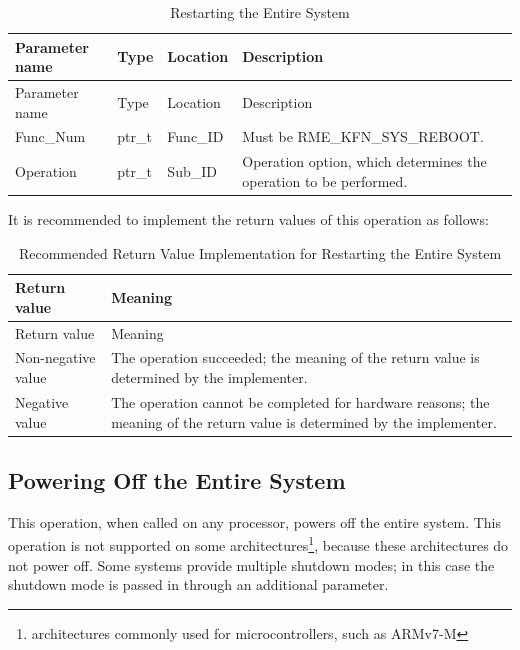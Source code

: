 \begin{xltabular}{\textwidth}{@{}>{\hsize\raggedright\arraybackslash}X>{\hsize\raggedright\arraybackslash}X>{\hsize\raggedright\arraybackslash}X>{\hsize\raggedright\arraybackslash}X@{}}
\caption{Restarting the Entire System}\label{tab:8-45-reboot-system}\\
\toprule
Parameter name & Type & Location & Description\tabularnewline
\endfirsthead
\toprule
Parameter name & Type & Location & Description\tabularnewline
\midrule
\endhead
\bottomrule
\endlastfoot
Func\_Num & ptr\_t & Func\_ID &
Must be RME\_KFN\_SYS\_REBOOT.\tabularnewline
Operation & ptr\_t & Sub\_ID &
Operation option, which determines the operation to be performed.\tabularnewline
\end{xltabular}
\nopagebreak[4]

It is recommended to implement the return values of this operation as follows:

\begin{xltabular}{\textwidth}{@{}>{\hsize\raggedright\arraybackslash}X>{\hsize\raggedright\arraybackslash}X@{}}
\caption{Recommended Return Value Implementation for Restarting the Entire System}\label{tab:8-46-reboot-system-suggested-return-values}\\
\toprule
Return value & Meaning\tabularnewline
\endfirsthead
\toprule
Return value & Meaning\tabularnewline
\midrule
\endhead
\bottomrule
\endlastfoot
    Non-negative value & The operation succeeded; the meaning of the return value is determined by the implementer.\tabularnewline
    Negative value & The operation cannot be completed for hardware reasons; the meaning of the return value is determined by the implementer.\tabularnewline
\end{xltabular}
\nopagebreak[4]

\subsection{Powering Off the Entire System}\label{subsec:8-power-off-system}

This operation, when called on any processor, powers off the entire system. This operation is not supported on some architectures\footnote{architectures commonly used for microcontrollers, such as ARMv7-M}, because these architectures do not power off. Some systems provide multiple shutdown modes; in this case the shutdown mode is passed in through an additional parameter.

